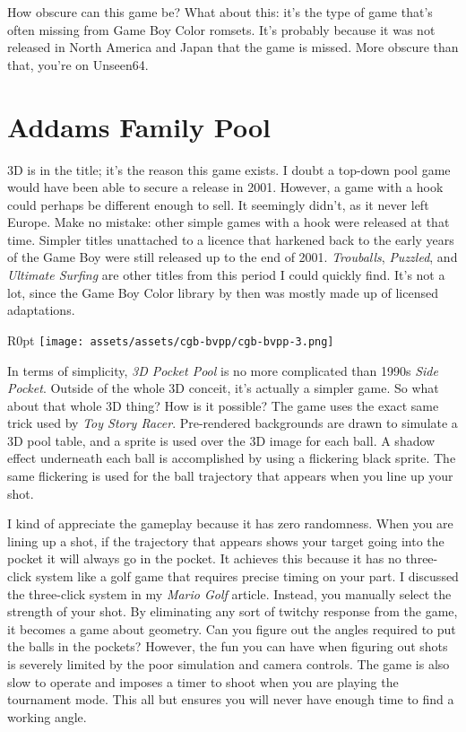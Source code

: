 \documentclass{book}
\begin{document}
How obscure can this game be? What about this: it’s the type of game that’s often missing from Game Boy Color romsets. It’s probably because it was not released in North America and Japan that the game is missed. More obscure than that, you’re on Unseen64.

\FloatBarrier\needspace{5pt}\section*{Addams Family Pool}\nopagebreak[4]

3D is in the title; it’s the reason this game exists. I doubt a top-down pool game would have been able to secure a release in 2001. However, a game with a hook could perhaps be different enough to sell. It seemingly didn’t, as it never left Europe. Make no mistake: other simple games with a hook were released at that time. Simpler titles unattached to a licence that harkened back to the early years of the Game Boy were still released up to the end of 2001. \emph{Trouballs}, \emph{Puzzled}, and \emph{Ultimate Surfing} are other titles from this period I could quickly find. It’s not a lot, since the Game Boy Color library by then was mostly made up of licensed adaptations.

\begin{wrapfigure}{R}{0pt} \texttt{[image: assets/assets/cgb-bvpp/cgb-bvpp-3.png]}\end{wrapfigure}
In terms of simplicity, \emph{3D Pocket Pool} is no more complicated than 1990s \emph{Side Pocket}. Outside of the whole 3D conceit, it’s actually a simpler game. So what about that whole 3D thing? How is it possible? The game uses the exact same trick used by \emph{Toy Story Racer}. Pre-rendered backgrounds are drawn to simulate a 3D pool table, and a sprite is used over the 3D image for each ball. A shadow effect underneath each ball is accomplished by using a flickering black sprite. The same flickering is used for the ball trajectory that appears when you line up your shot.

I kind of appreciate the gameplay because it has zero randomness. When you are lining up a shot, if the trajectory that appears shows your target going into the pocket it will always go in the pocket. It achieves this because it has no three-click system like a golf game that requires precise timing on your part. I discussed the three-click system in my \emph{Mario Golf} article. Instead, you manually select the strength of your shot. By eliminating any sort of twitchy response from the game, it becomes a game about geometry. Can you figure out the angles required to put the balls in the pockets? However, the fun you can have when figuring out shots is severely limited by the poor simulation and camera controls. The game is also slow to operate and imposes a timer to shoot when you are playing the tournament mode. This all but ensures you will never have enough time to find a working angle.
\end{document}
